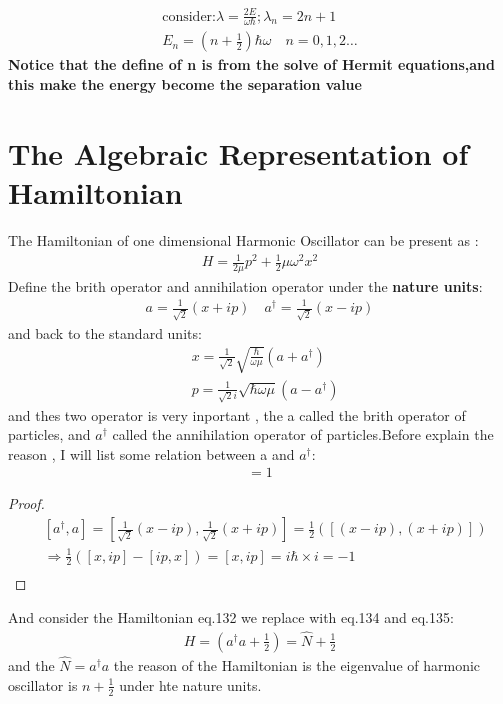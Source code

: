 \documentclass{article}
\begin{document}
\begin{align}
\text{consider:}\lambda=\frac{2E}{\omega\hbar};\lambda_n=2n+1\\
E_n=(n+\frac12)\hbar\omega\quad n=0,1,2\dots
\end{align}
\textbf{Notice that the define of n is from the solve of Hermit equations,and this make the energy become the separation value}

\section{The Algebraic Representation of Hamiltonian}
The Hamiltonian of one dimensional Harmonic Oscillator can be present as :
\begin{align}
  H=\frac1{2\mu}p^2+\frac12\mu\omega^2x^2
\end{align}
Define the brith operator and annihilation operator under the \textbf{nature units}:
\begin{align}
  a=\frac1{\sqrt{2}}(x+ip)\quad a^{\dagger}=\frac1{\sqrt{2}}(x-ip)
\end{align}
and back to the standard units:
\begin{align}
  &x=\frac1{\sqrt{2}}\sqrt{\frac{\hbar}{\omega\mu}}(a+a^{\dagger})\\
  &p=\frac1{\sqrt{2}i}\sqrt{\hbar\omega\mu}(a-a^{\dagger})
\end{align}
and thes two operator is very inportant , the a called the brith operator of particles, and $a^{\dagger}$ called the annihilation operator of particles.Before explain the reason , I will list some relation between a and $a^{\dagger}$:
\begin{align}
  [a,a^{\dagger}]=1
\end{align}

\begin{proof}
  \begin{align*}
    &[a^{\dagger},a]=[\frac1{\sqrt{2}}(x-ip),\frac1{\sqrt{2}}(x+ip)]=\frac12([(x-ip),(x+ip)])\\
    &\Rightarrow \frac12([x,ip]-[ip,x])=[x,ip]=i\hbar \times i=-1 \\
  \end{align*}
\end{proof}
And consider the Hamiltonian eq.132 we replace with eq.134 and eq.135:
\begin{align}
  H=(a^{\dagger}a+\frac12)=\hat N+\frac12
\end{align}
and the $\hat N=a^{\dagger}a$ the reason of the Hamiltonian is the eigenvalue of harmonic oscillator is $n+\frac12$ under hte nature units.
\end{document}
